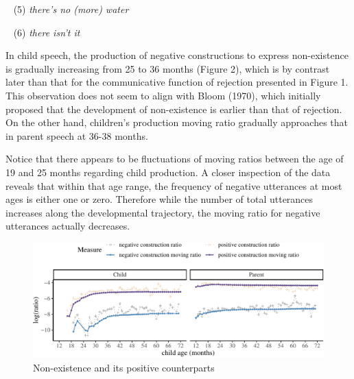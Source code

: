 \documentclass[
  english,
  man,floatsintext]{apa6}
\begin{document}
~
(5) \emph{there's no (more) water}

~
(6) \emph{there isn't it}

In child speech, the production of negative constructions to express non-existence is gradually increasing from 25 to 36 months (Figure 2), which is by contrast later than that for the communicative function of rejection presented in Figure 1. This observation does not seem to align with Bloom (1970), which initially proposed that the development of non-existence is earlier than that of rejection. On the other hand, children's production moving ratio gradually approaches that in parent speech at 36-38 months.

Notice that there appears to be fluctuations of moving ratios between the age of 19 and 25 months regarding child production. A closer inspection of the data reveals that within that age range, the frequency of negative utterances at most ages is either one or zero. Therefore while the number of total utterances increases along the developmental trajectory, the moving ratio for negative utterances actually decreases.

\begin{figure}[H]

{\centering \includegraphics{neg_construction_article_files/figure-latex/existence-1} 

}

\caption{Non-existence and its positive counterparts}\label{fig:existence}
\end{figure}
\end{document}

